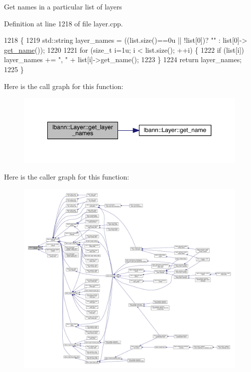 Get names in a particular list of layers 

Definition at line 1218 of file layer.\+cpp.


\begin{DoxyCode}
1218                                                                     \{
1219   std::string layer\_names = ((list.size()==0u || !list[0])? \textcolor{stringliteral}{""} : list[0]->
      \hyperlink{classlbann_1_1Layer_a80027550202fa7dbb1dd55fa8a66c84b}{get\_name}());
1220 
1221   \textcolor{keywordflow}{for} (\textcolor{keywordtype}{size\_t} i=1u; i < list.size(); ++i) \{
1222     \textcolor{keywordflow}{if} (list[i]) layer\_names += \textcolor{stringliteral}{", "} + list[i]->get\_name();
1223   \}
1224   \textcolor{keywordflow}{return} layer\_names;
1225 \}
\end{DoxyCode}
Here is the call graph for this function\+:\nopagebreak
\begin{figure}[H]
\begin{center}
\leavevmode
\includegraphics[width=350pt]{classlbann_1_1Layer_af4a093d91552cf079217eb346bbb847f_cgraph}
\end{center}
\end{figure}
Here is the caller graph for this function\+:\nopagebreak
\begin{figure}[H]
\begin{center}
\leavevmode
\includegraphics[width=350pt]{classlbann_1_1Layer_af4a093d91552cf079217eb346bbb847f_icgraph}
\end{center}
\end{figure}
\mbox{\label{classlbann_1_1Layer_a9f94210cbb973f1df89ef649899094a1}} 
